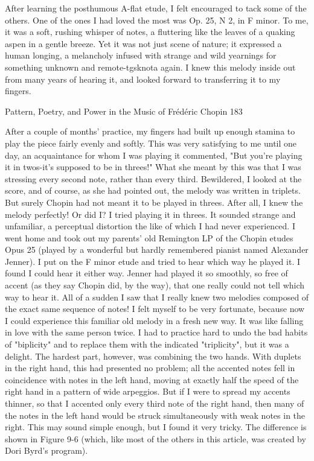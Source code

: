 After learning the posthumous A-flat etude, I felt encouraged to tack some of the others.
One of the ones I had loved the most was Op. 25, N 2, in F minor. To me, it was a soft,
rushing whisper of notes, a fluttering like the leaves of a quaking aspen in a gentle
breeze. Yet it was not just scene of nature; it expressed a human longing, a melancholy
infused with strange and wild yearnings for something unknown and remote-tgsknota
again. I knew this melody inside out from many years of hearing it, and looked forward
to transferring it to my fingers.




Pattern, Poetry, and Power in the Music of Frédéric Chopin                               183

After a couple of months' practice, my fingers had built up enough stamina to play the
piece fairly evenly and softly. This was very satisfying to me until one day, an
acquaintance for whom I was playing it commented, "But you're playing it in twos-it's
supposed to be in threes!" What she meant by this was that I was stressing every second
note, rather than every third. Bewildered, I looked at the score, and of course, as she had
pointed out, the melody was written in triplets. But surely Chopin had not meant it to be
played in threes. After all, I knew the melody perfectly! Or did I? I tried playing it in
threes. It sounded strange and unfamiliar, a perceptual distortion the like of which I had
never experienced.
        I went home and took out my parents' old Remington LP of the Chopin etudes
Opus 25 (played by a wonderful but hardly remembered pianist named Alexander
Jenner). I put on the F minor etude and tried to hear which way he played it. I found I
could hear it either way. Jenner had played it so smoothly, so free of accent (as they say
Chopin did, by the way), that one really could not tell which way to hear it. All of a
sudden I saw that I really knew two melodies composed of the exact same sequence of
notes! I felt myself to be very fortunate, because now I could experience this familiar old
melody in a fresh new way. It was like falling in love with the same person twice.
        I had to practice hard to undo the bad habits of "biplicity" and to replace them
with the indicated "triplicity", but it was a delight. The hardest part, however, was
combining the two hands. With duplets in the right hand, this had presented no problem;
all the accented notes fell in coincidence with notes in the left hand, moving at exactly
half the speed of the right hand in a pattern of wide arpeggios. But if I were to spread my
accents thinner, so that I accented only every third note of the right hand, then many of
the notes in the left hand would be struck simultaneously with weak notes in the right.
This may sound simple enough, but I found it very tricky. The difference is shown in
Figure 9-6 (which, like most of the others in this article, was created by Dori Byrd's
program).

